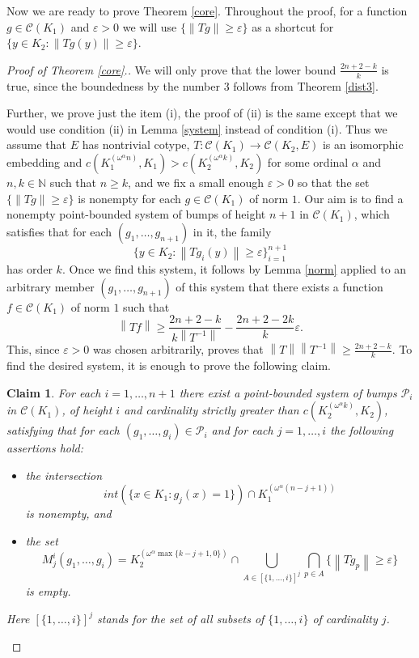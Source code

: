 \documentclass{amsart}
\numberwithin{equation}{section}
\newtheorem*{claim}{Claim}
\theoremstyle{definition}
\def\C{\mathcal C}
\def\ep{\varepsilon}
\def\en{\mathbb N}
\newcommand{\norm}[1]{\left\|#1\right\|}
\begin{document}
Now we are ready to prove Theorem \ref{core}. 
Throughout the proof, for a function $g \in \C(K_1)$ and $\ep>0$ we will use $\{ \norm{Tg} \geq \ep \}$ as a shortcut for $\{ y \in K_2: \norm{Tg(y)} \geq \ep \}$.

\begin{proof}[Proof of Theorem \ref{core}.]
We will only prove that the lower bound $\frac{2n+2-k}{k}$ is true, since the boundedness by the number $3$ follows from Theorem \ref{dist3}.

Further, we prove just the item (i), the proof of (ii) is the same except that we would use condition (ii) in Lemma \ref{system} instead of condition (i). Thus we assume that $E$ has nontrivial cotype, $T:\C(K_1) \rightarrow \C(K_2, E)$ is an isomorphic embedding and $c(K_1^{(\omega^{\alpha}n)}, K_1)>c(K_2^{(\omega^{\alpha}k)}, K_2)$ for some ordinal $\alpha$ and $n, k \in \en$ such that $n \geq k$, and we fix a small enough $\ep>0$ so that the set $\{ \norm{Tg} \geq \ep \}$ is nonempty for each $g \in \C(K_1)$ of norm $1$. Our aim is to find a nonempty point-bounded system of bumps of height $n+1$ in $\C(K_1)$, which  satisfies that for each $(g_1, \ldots, g_{n+1})$ in it, the family \[\{y \in K_2: \norm{Tg_i(y)} \geq \ep \}_{i=1}^{n+1}\]
has order $k$. Once we find this system, it follows by Lemma \ref{norm} applied to an arbitrary member $(g_1, \ldots, g_{n+1})$ of this system that there exists a function $f \in \C(K_1)$ of norm $1$ such that 
	\[\norm{Tf} \geq \frac{2n+2-k}{k\norm{T^{-1}}}-\frac{2n+2-2k}{k}\ep.\] 
This, since $\ep>0$ was chosen arbitrarily, proves that $\norm{T}\norm{T^{-1}}\geq \frac{2n+2-k}{k}$. To find the desired system, it is enough to prove the following claim. 

\begin{claim}
	For each $i=1, \ldots, n+1$ there exist a point-bounded system of bumps $\mathcal{P}_i$ in $\C(K_1)$, of height $i$ and cardinality strictly greater than $c(K_2^{(\omega^{\alpha} k)}, K_2)$, satisfying that for each 
	$(g_1, \ldots ,g_{i}) \in \mathcal{P}_i$ and for each $j=1, \ldots, i$ the following assertions hold:
    \begin{itemize}
        \item[(i)] the intersection \[int(\{x \in K_1: g_j(x)=1\}) \cap K_1^{(\omega^{\alpha}(n-j+1))}\]
        is nonempty, and
        \item[(ii)] the set \[M_j^i(g_1, \ldots ,g_i)=K_2^{(\omega^{\alpha} \max\{k-j+1, 0\})} \cap \bigcup_{A\in[\{1,\ldots,i\}]^j} \bigcap_{p \in A} \{ \norm{Tg_p} \geq \ep\}\]
        is empty.
    \end{itemize}
Here $[\{ 1,\ldots,i\}]^j$ stands for the set of all subsets of $\{1,\dots,i\}$ of cardinality $j$.
\end{claim}


\end{proof}
\end{document}
